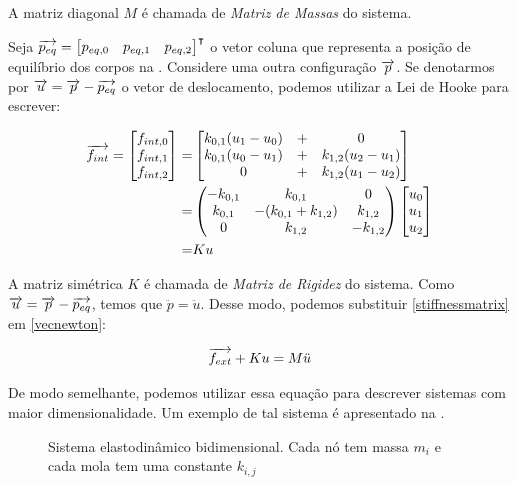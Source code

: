 A matriz diagonal $M$ é chamada de \emph{Matriz de Massas} do sistema.

Seja $\overrightarrow{p_{eq}} = \begin{bmatrix}p_{eq,0} & p_{eq,1} & p_{eq,2}\end{bmatrix}^\intercal$ o vetor coluna que representa a posição de equilíbrio dos corpos na . Considere uma outra configuração $\overrightarrow{p}$. Se denotarmos por $\overrightarrow{u} = \overrightarrow{p}-\overrightarrow{p_{eq}}$ o vetor de deslocamento, podemos utilizar a Lei de Hooke para escrever:

\begin{eqnarray}
	\overrightarrow{f_{int}} =
	\begin{bmatrix}
		f_{int,0}\\
		f_{int,1}\\
		f_{int,2}
	\end{bmatrix}
	=&
	\begin{bmatrix}
		k_{0,1}(u_1 - u_0)&+& 0\\
		k_{0,1}(u_0 - u_1)&+& k_{1,2}(u_2 - u_1)\\
		0&+& k_{1,2}(u_1 - u_2)
	\end{bmatrix}\\
	=& 
	\begin{pmatrix}
		-k_{0,1} & k_{0,1} & 0\\
		k_{0,1} & -(k_{0,1}+k_{1,2}) & k_{1,2}\\
		0 & k_{1,2} & -k_{1,2}
	\end{pmatrix}
	\begin{bmatrix}
		u_0\\
		u_1\\
		u_2
	\end{bmatrix}\\
	=& Ku \label{stiffnessmatrix}
\end{eqnarray}

A matriz simétrica $K$ é chamada de \emph{Matriz de Rigidez} do sistema. Como $\overrightarrow{u} = \overrightarrow{p} - \overrightarrow{p_{eq}}$, temos que $\ddot{p} = \ddot{u}$. Desse modo, podemos substituir \eqref{stiffnessmatrix} em \eqref{vecnewton}:

\begin{equation}
	\overrightarrow{f_{ext}} + Ku = M\ddot{u}
\end{equation}

De modo semelhante, podemos utilizar essa equação para descrever sistemas com maior dimensionalidade. Um exemplo de tal sistema é apresentado na .

\begin{figure}[ht]
	\centering
	
	\caption[Sistema elastodinâmico bidimensional]{Sistema elastodinâmico bidimensional. Cada nó tem massa $m_i$ e cada mola tem uma constante $k_{i,j}$}\label{2dbodysystem}
\end{figure}

